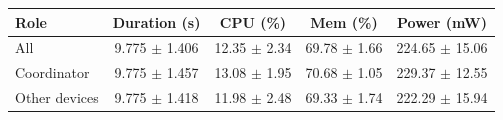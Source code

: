 \begin{tabular}{lcccc}
\hline
\textbf{Role} & \textbf{Duration (s)} & \textbf{CPU (\%)} & \textbf{Mem (\%)} & \textbf{Power (mW)} \\
\hline
All & 9.775 $\pm$ 1.406 & 12.35 $\pm$ 2.34 & 69.78 $\pm$ 1.66 & 224.65 $\pm$ 15.06 \\
Coordinator & 9.775 $\pm$ 1.457 & 13.08 $\pm$ 1.95 & 70.68 $\pm$ 1.05 & 229.37 $\pm$ 12.55 \\
Other devices & 9.775 $\pm$ 1.418 & 11.98 $\pm$ 2.48 & 69.33 $\pm$ 1.74 & 222.29 $\pm$ 15.94 \\
\hline
\end{tabular}
